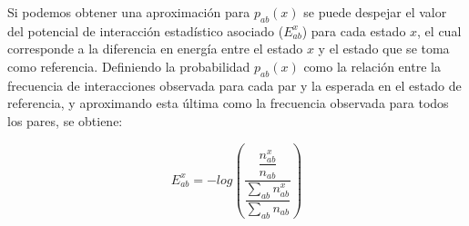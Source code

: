 Si podemos obtener una aproximación para $p_{ab}(x)$ se puede despejar el valor del potencial de interacción estadístico asociado ($E_{ab}^x$) para cada estado $x$,
el cual corresponde a la diferencia en energía entre el estado $x$ y el estado que se toma como referencia.
Definiendo la probabilidad $p_{ab}(x)$ como la relación entre la frecuencia de interacciones observada para cada par y la esperada en el estado de referencia, 
y aproximando esta última como la frecuencia observada para todos los pares, se obtiene:

\begin{equation}
{E_{ab}^x = -log\left(\dfrac{\dfrac{n_{ab}^x}{n_{ab}}} {\dfrac{\sum\limits_{ab} n_{ab}^x}{\sum\limits_{ab} n_{ab}}}\right)}
\end{equation}



